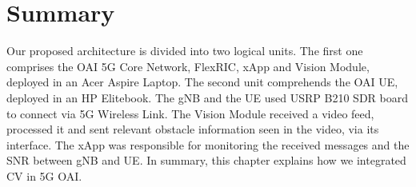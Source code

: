 \section{Summary}\label{sec:summary}
Our proposed architecture is divided into two logical units.
The first one comprises the OAI 5G Core Network, FlexRIC, xApp and Vision Module, deployed in an Acer Aspire Laptop.
The second unit comprehends the OAI UE, deployed in an HP Elitebook.
The gNB and the UE used USRP B210 SDR board to connect via 5G Wireless Link.
The Vision Module received a video feed, processed it and sent relevant obstacle information seen in the video, via its interface.
The xApp was responsible for monitoring the received messages and the SNR between gNB and UE\@.
In summary, this chapter explains how we integrated CV in 5G OAI\@.






